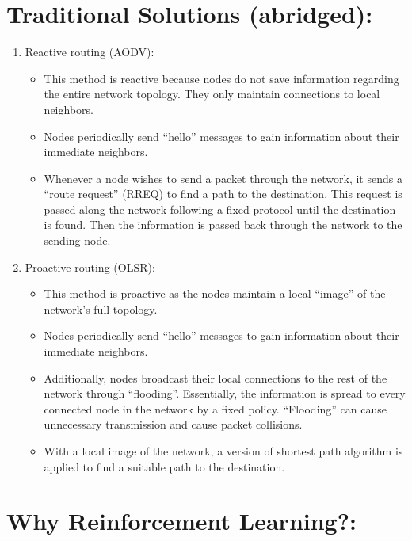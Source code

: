 \documentclass[11pt]{article}
\begin{document}
    \hypertarget{traditional-solutions-abridged}{%
\section{Traditional Solutions
(abridged):}\label{traditional-solutions-abridged}}

\begin{enumerate}
\def\labelenumi{\arabic{enumi}.}
\item
  Reactive routing (AODV):

  \begin{itemize}
  \item
    This method is reactive because nodes do not save information
    regarding the entire network topology. They only maintain
    connections to local neighbors.
  \item
    Nodes periodically send ``hello'' messages to gain information about
    their immediate neighbors.
  \item
    Whenever a node wishes to send a packet through the network, it
    sends a ``route request'' (RREQ) to find a path to the destination.
    This request is passed along the network following a fixed protocol
    until the destination is found. Then the information is passed back
    through the network to the sending node. 
  \end{itemize}
\item
  Proactive routing (OLSR):

  \begin{itemize}
  \item
    This method is proactive as the nodes maintain a local ``image'' of
    the network's full topology.
  \item
    Nodes periodically send ``hello'' messages to gain information about
    their immediate neighbors.
  \item
    Additionally, nodes broadcast their local connections to the rest of
    the network through ``flooding''. Essentially, the information is
    spread to every connected node in the network by a fixed policy.
    ``Flooding'' can cause unnecessary transmission and cause packet
    collisions.
  \item
    With a local image of the network, a version of shortest path
    algorithm is applied to find a suitable path to the destination.
  \end{itemize}
\end{enumerate}

    \hypertarget{why-reinforcement-learning}{%
\pagebreak
\section{Why Reinforcement
Learning?:}\label{why-reinforcement-learning}}
\end{document}
